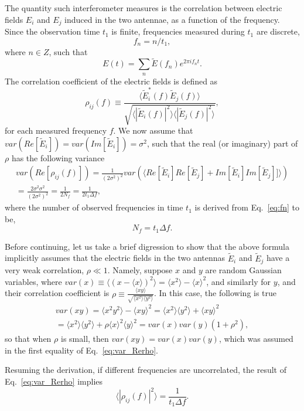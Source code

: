 \documentclass[12pt]{paper}
\newcommand{\beq}{\begin{equation}}
\newcommand{\eeq}{\end{equation}}
\newcommand{\bga}{\begin{gathered}}
\newcommand{\ega}{\end{gathered}}
\begin{document}
The quantity such interferometer measures is the correlation between electric fields $E_i$ and $E_j$ induced in the two antennae, as a function of the frequency. Since the observation time $t_1$ is finite, frequencies measured during $t_1$ are discrete, 
\beq
f_n = n/t_1, 
\label{eq:fn}
\eeq
where $n\in Z$, such that
\beq
E(t) = \sum_{n}\widetilde{E}(f_n)e^{2\pi if_nt}.
\eeq
The correlation coefficient of the electric fields is defined as
\beq
\rho_{ij}(f) \equiv \frac{\langle \widetilde{E}^*_i(f)\widetilde E_j(f)\rangle}{\sqrt{\langle |\widetilde{E}_i(f)|^2\rangle\langle|\widetilde E_j(f)|^2\rangle}},
\label{eq:rho_ij}
\eeq
for each measured frequency $f$. We now assume that $var(Re[ \widetilde E_i])=var(Im[\widetilde E_i])=\sigma^2$, such that the real (or imaginary) part of $\rho$ has the following variance
\beq
\bga
var(Re[\rho_{ij}(f)]) = \frac{1}{(2\sigma^2)^2}var(\langle Re[\widetilde{E}_i]Re[\widetilde{E}_j] + Im[\widetilde{E}_i]Im[\widetilde{E}_j]]\rangle) \\
= \frac{2\sigma^2\sigma^2}{(2\sigma^2)^2} = \frac{1}{2N_f} = \frac{1}{2t_1\Delta f},
\ega
\label{eq:var_Rerho}
\eeq
where the number of observed frequencies in time $t_1$ is derived from Eq.~\ref{eq:fn} to be,
\beq
N_f =  t_1\Delta f.
\label{eq:Nf}
\eeq

Before continuing, let us take a brief digression to show that the above formula implicitly assumes that the electric fields in the two antennas $\widetilde E_i$ and $\widetilde E_j$ have a very weak correlation, $\rho\ll 1$. Namely, suppose $x$ and $y$ are random Gaussian variables, where $var(x)\equiv\langle(x-\langle x\rangle)^2\rangle = \langle x^2\rangle - \langle x \rangle^2$, and similarly for $y$, and their correlation coefficient is $\rho\equiv \frac{\langle xy\rangle}{\sqrt{\langle x^2\rangle \langle y^2\rangle}}$. In this case, the following is true
\beq
\bga
var(xy) = \langle x^2y^2\rangle -  \langle xy \rangle^2 = 
\langle x^2\rangle \langle y^2\rangle + \langle xy\rangle^2\\
=\langle x^2\rangle \langle y^2\rangle+\rho \langle x\rangle^2\langle y\rangle^2=var(x)var(y)(1+\rho^2),
\ega
\eeq
so that when $\rho$ is small, then $var(xy)=var(x)var(y)$, which was assumed in the first equality of Eq.~\ref{eq:var_Rerho}.

Resuming the derivation, if different frequencies are uncorrelated, the result of Eq.~\ref{eq:var_Rerho} implies
\beq
\langle|\rho_{ij}(f)|^2\rangle = \frac{1}{t_1\Delta f}.
\label{eq:var_rho}
\eeq
\end{document}
